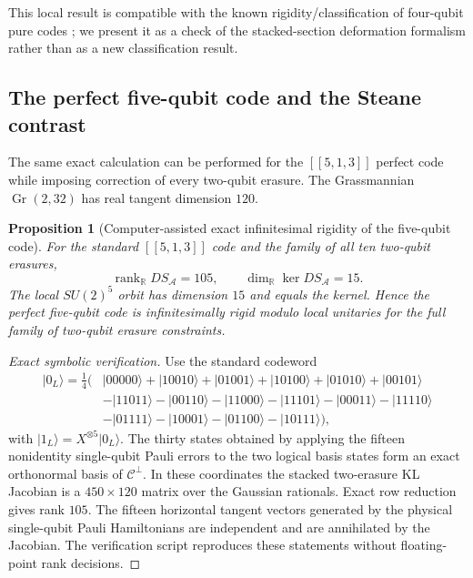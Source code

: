 \documentclass[11pt]{article}
\newtheorem{proposition}[theorem]{Proposition}
\theoremstyle{definition}
\newcommand{\cC}{\mathcal C}
\newcommand{\Gr}{\operatorname{Gr}}
\newcommand{\rank}{\operatorname{rank}}
\newcommand{\R}{\mathbb R}
\newcommand{\1}{\mathbf 1}
\newcommand{\ket}[1]{\lvert #1\rangle}
\begin{document}
This local result is compatible with the known rigidity/classification of four-qubit pure codes \cite{Tan2025}; we present it as a check of the stacked-section deformation formalism rather than as a new classification result.


\subsection{The perfect five-qubit code and the Steane contrast}

The same exact calculation can be performed for the $[[5,1,3]]$ perfect code while imposing correction of every two-qubit erasure.  The Grassmannian $\Gr(2,32)$ has real tangent dimension $120$.

\begin{proposition}[Computer-assisted exact infinitesimal rigidity of the five-qubit code]
\label{prop:513}
For the standard $[[5,1,3]]$ code and the family of all ten two-qubit erasures,
\[
\rank_{\R}DS_{\mathcal A}=105,
\qquad
\dim_{\R}\ker DS_{\mathcal A}=15.
\]
The local $SU(2)^5$ orbit has dimension $15$ and equals the kernel.  Hence the perfect five-qubit code is infinitesimally rigid modulo local unitaries for the full family of two-qubit erasure constraints.
\end{proposition}

\begin{proof}[Exact symbolic verification]
Use the standard codeword
\begin{align*}
\ket{0_L}=\frac14(&
\ket{00000}+\ket{10010}+\ket{01001}+\ket{10100}
+\ket{01010}+\ket{00101}\\
&-\ket{11011}-\ket{00110}-\ket{11000}-\ket{11101}
-\ket{00011}-\ket{11110}\\
&-\ket{01111}-\ket{10001}-\ket{01100}-\ket{10111}),
\end{align*}
with $\ket{1_L}=X^{\otimes5}\ket{0_L}$.  The thirty states obtained by applying the fifteen nonidentity single-qubit Pauli errors to the two logical basis states form an exact orthonormal basis of $\cC^\perp$.  In these coordinates the stacked two-erasure KL Jacobian is a $450\times120$ matrix over the Gaussian rationals.  Exact row reduction gives rank $105$.  The fifteen horizontal tangent vectors generated by the physical single-qubit Pauli Hamiltonians are independent and are annihilated by the Jacobian.  The verification script reproduces these statements without floating-point rank decisions.
\end{proof}
\end{document}

